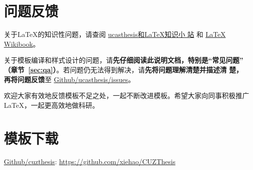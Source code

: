 \section{问题反馈}

关于\LaTeX{}的知识性问题，请查阅
\href{https://github.com/mohuangrui/ucasthesis/wiki}{ucasthesis和\LaTeX{}知识小
站} 和 \href{https://en.wikibooks.org/wiki/LaTeX}{\LaTeX{} Wikibook}。

关于模板编译和样式设计的问题，请\textbf{先仔细阅读此说明文档，特别是“常见问题”
（章节~\ref{sec:qa}）}。若问题仍无法得到解决，请\textbf{先将问题理解清楚并描述清
楚，再将问题反馈}至
\href{https://github.com/xiehao/CUZThesis/issues}{Github/ucasthesis/issues}。

欢迎大家有效地反馈模板不足之处，一起不断改进模板。希望大家向同事积极推广
\LaTeX{}，一起更高效地做科研。

\section{模板下载}

\begin{center}
    \href{https://github.com/xiehao/CUZThesis}{Github/cuzthesis}: \url{https://github.com/xiehao/CUZThesis}
\end{center}
